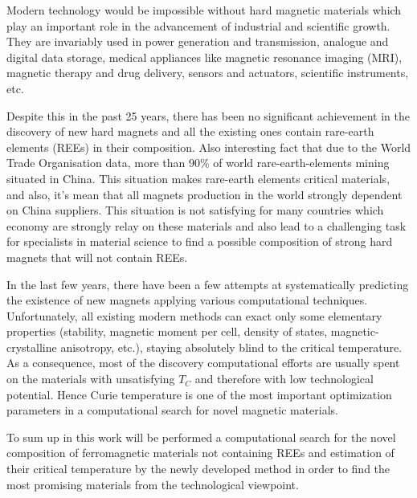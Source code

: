Modern technology would be impossible without hard magnetic materials which play an important role in the advancement of industrial and scientific growth. They are invariably used in power generation and transmission, analogue and digital data storage, medical appliances like magnetic resonance imaging (MRI), magnetic therapy and drug delivery, sensors and actuators, scientific instruments, etc. 

Despite this in the past 25 years, there has been no significant achievement in the discovery of new hard magnets and all the existing ones contain rare-earth elements (REEs) in their composition. Also interesting fact that due to the World Trade Organisation data, more than 90\% of world rare-earth-elements mining situated in China. This situation makes rare-earth elements critical materials, and also, it's mean that all magnets production in the world strongly dependent on China suppliers. This situation is not satisfying for many countries which economy are strongly relay on these materials and also lead to a challenging task for specialists in material science to find a possible composition of strong hard magnets that will not contain REEs.


In the last few years, there have been a few attempts at systematically predicting the existence of new magnets applying various computational techniques. Unfortunately, all existing modern methods can exact only some elementary properties (stability, magnetic moment per cell, density of states, magnetic-crystalline anisotropy, etc.), staying absolutely blind to the critical temperature. As a consequence, most of the discovery computational efforts are usually spent on the materials with unsatisfying $T_{C}$ and therefore with low technological potential. Hence Curie temperature is one of the most important optimization parameters in a computational search for novel magnetic materials. 

To sum up in this work will be performed a computational search for the novel composition of ferromagnetic materials not containing REEs and estimation of their critical temperature by the newly developed method in order to find the most promising materials from the technological viewpoint.